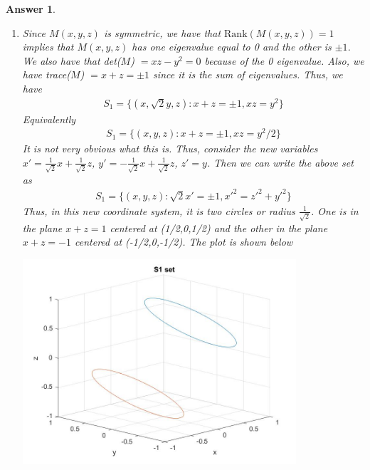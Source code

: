 \documentclass[12pt]{article}
\theoremstyle{colon}
\newtheorem*{answer}{Answer}
\begin{document}
\begin{answer}
  \leavevmode
  \begin{enumerate}[label=\arabic*)]
    \item Since $M(x,y,z)$ is symmetric, we have that $\text{Rank}(M(x,y,z)) = 1$ implies that $M(x,y,z)$ has one eigenvalue equal to 0 and the other is $\pm 1$. We also have that det($M$) $= xz - y^2 = 0$ because of the 0 eigenvalue. Also, we have trace($M$) $= x + z = \pm 1$ since it is the sum of eigenvalues. Thus, we have
      \begin{gather*}
        S_1 = \{ (x, \sqrt{2}y, z) : x+z = \pm 1, xz = y^2 \}
      \end{gather*}
      Equivalently
      \begin{gather*}
        S_1 = \{ (x, y, z) : x+z = \pm 1, xz = y^2/2 \}
      \end{gather*}
      It is not very obvious what this is. Thus, consider the new variables $x' = \frac{1}{\sqrt{2}} x + \frac{1}{\sqrt{2}}z$, $y' = -\frac{1}{\sqrt{2}} x + \frac{1}{\sqrt{2}}z$, $z' = y$. Then we can write the above set as
      \begin{gather*}
        S_1 = \{ (x, y, z) : \sqrt{2} x' = \pm 1, x'^2 = z'^2 + y'^2 \}
      \end{gather*}
      Thus, in this new coordinate system, it is two circles or radius $\frac{1}{\sqrt{2}}$. One is in the plane $x+z = 1$ centered at (1/2,0,1/2) and the other in the plane $x+z = -1$ centered at (-1/2,0,-1/2). The plot is shown below

      \begin{center}
        \includegraphics[width=0.8\textwidth]{41_circles.jpg}
      \end{center}


\end{enumerate}
\end{answer}
\end{document}
